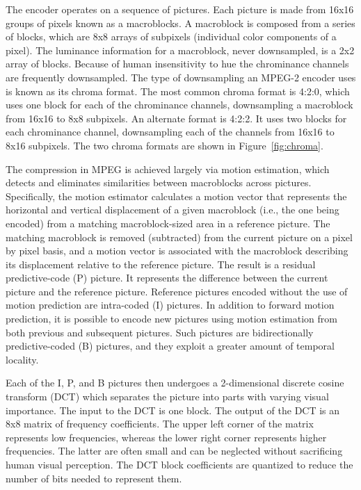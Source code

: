 The encoder operates on a sequence of pictures. Each picture is made
from 16x16 groups of pixels known as a macroblocks.  A macroblock
is composed from a series of blocks, which are 8x8 arrays of subpixels
(individual color components of a pixel). The luminance information for
a macroblock, never downsampled, is a 2x2 array of blocks. 
Because of human insensitivity to hue the chrominance channels 
are frequently downsampled. The type of downsampling an MPEG-2 encoder
uses is known as its chroma format. The most common
chroma format is 4:2:0, which uses one block for each of the
chrominance channels, downsampling a macroblock from 16x16 to 8x8
subpixels. An alternate format is 4:2:2. It uses two blocks for each
chrominance channel, downsampling each of the channels from 16x16 to
8x16 subpixels. The two chroma formats are shown in
Figure~\ref{fig:chroma}.

The compression in MPEG is achieved largely via motion estimation,
which detects and eliminates similarities between macroblocks across
pictures. Specifically, the motion estimator calculates a motion
vector that represents the horizontal and vertical displacement of a
given macroblock (i.e., the one being encoded) from a matching
macroblock-sized area in a reference picture.  The matching macroblock
is removed (subtracted) from the current picture on a pixel by pixel
basis, and a motion vector is associated with the macroblock
describing its displacement relative to the reference picture. The
result is a residual predictive-code (P) picture. It represents the
difference between the current picture and the reference
picture. Reference pictures encoded without the use of motion
prediction are intra-coded (I) pictures. In addition to forward motion
prediction, it is possible to encode new pictures using motion
estimation from both previous and subsequent pictures. Such pictures
are bidirectionally predictive-coded (B) pictures, and they exploit a
greater amount of temporal locality.

Each of the I, P, and B pictures then undergoes a 2-dimensional
discrete cosine transform (DCT) which separates the picture into parts
with varying visual importance. The input to the DCT is one block.
The output of the
DCT is an 8x8 matrix of frequency coefficients. The upper left corner
of the matrix represents low frequencies, whereas the lower right
corner represents higher frequencies. The latter are often small and
can be neglected without sacrificing human visual perception. The DCT 
block coefficients are quantized to reduce the number of bits needed
to represent them. 

